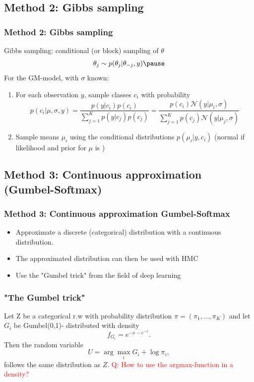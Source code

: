 \documentclass[10pt]{beamer}
\begin{document}
\subsection{Method  2: Gibbs sampling}

\begin{frame}
	\frametitle{Method 2: Gibbs sampling}
	 Gibbs sampling: conditional (or block) sampling of $\theta$
	\begin{equation*}
		\theta_j \sim p(\theta_j|\theta_{-j}, y)\pause
	\end{equation*}
	For the GM-model, with $\sigma$ known:
	\begin{enumerate}
		\item For each observation $y$, sample classes $c_i$ with probability 
		\begin{equation*}
			p(c_i | \mu, \sigma, y) = \frac{p(y| c_i )p(c_i)}{\sum_{j=1}^Kp(y | c_j)p(c_j)} = \frac{p(c_i)\mathcal{N}(y | \mu_i, \sigma)}{\sum_{j=1}^Kp(c_j)\mathcal{N}(y | \mu_j, \sigma)}
		\end{equation*}\pause
		\item Sample means $\mu_i$ using the conditional distributions $p(\mu_i | y, c_i)$ (normal if likelihood and prior for $\mu$ is  )
	\end{enumerate}	
\end{frame}

\subsection{Method 3: Continuous approximation (Gumbel-Softmax)}

\begin{frame}
	\frametitle{Method 3: Continuous approximation Gumbel-Softmax}
	\begin{itemize}
		\item Approximate a discrete (categorical) distribution with a continuous distribution.
		\item The approximated distribution can then be used with HMC
		\item Use the "Gumbel trick" \cite{gs} from the field of deep learning
	\end{itemize}
\end{frame}

\begin{frame}
	\frametitle{"The Gumbel trick"}
	  Let Z be a categorical r.w with probability distribution $\pi = (\pi_1,\dots, \pi_K)$ and let $G_i $ be Gumbel(0,1)-		distributed with density
	\begin{equation*}
		f_{G_i} = e^{-x-e^{-x}}.
	\end{equation*}
	Then the random variable
	\begin{equation*} 
		U = \arg\max_i G_i + \log \pi_i,
	\end{equation*}
	follows the same distribution as $Z$.\pause
	\textcolor{red}{Q: How to use the argmax-function in a density?}  
\end{frame}
\end{document}
